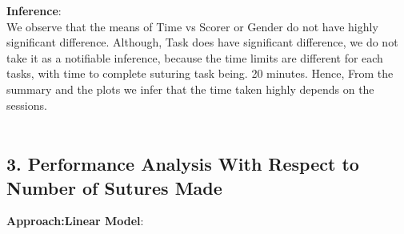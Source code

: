 \documentclass[12pt,epsf]{report}
\begin{document}
\textbf{Inference}:\\
We observe that the means of Time vs Scorer or Gender do not have highly significant difference. Although, Task does have significant difference, we do not take it as a notifiable inference, because the time limits are different for each tasks, with time to complete suturing task being. 20 minutes. Hence, From the summary and the plots we infer that the time taken highly depends on the sessions.\\
\\
\FloatBarrier
\subsection*{3. Performance Analysis With Respect to Number of Sutures Made}
\textbf{Approach:Linear Model}:\\
\end{document}
